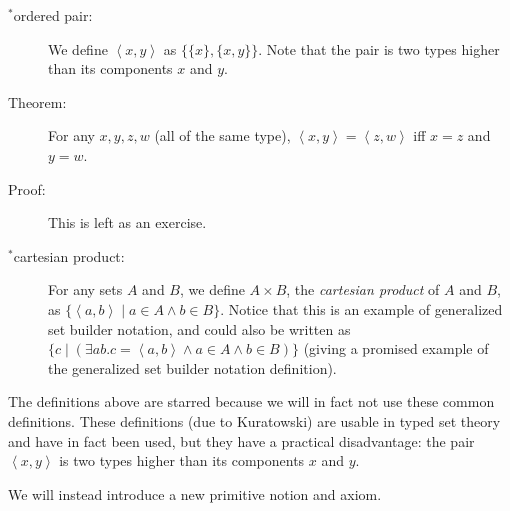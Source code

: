 \documentclass[12pt]{book}
\begin{document}
\begin{description}

\item[$^*$ordered pair:]  We define $\left<x,y\right>$ as $\{\{x\},\{x,y\}\}$.
Note that the pair is two types higher than its components $x$ and $y$.

\item[Theorem:]  For any $x,y,z,w$ (all of the same type), $\left<x,y\right>=\left<z,w\right>$ iff $x=z$ and $y=w$.

\item[Proof:]  This is left as an exercise.

\item[$^*$cartesian product:] For any sets $A$ and $B$, we define $A
\times B$, the {\em cartesian product\/} of $A$ and $B$, as
$\{\left<a,b\right> \mid a \in A \wedge b \in B\}$.  Notice that this
is an example of generalized set builder notation, and could also be
written as $\{c \mid (\exists ab.c = \left<a,b\right> \wedge a \in A
\wedge b \in B)\}$ (giving a promised example of the
generalized set builder notation definition).

\end{description}

The definitions above are starred because we will in fact not use
these common definitions.  These definitions (due to Kuratowski) are
usable in typed set theory and have in fact been used, but they have a
practical disadvantage: the pair $\left<x,y\right>$ is two types
higher than its components $x$ and $y$.

We will instead introduce a new primitive notion and axiom.
\end{document}
